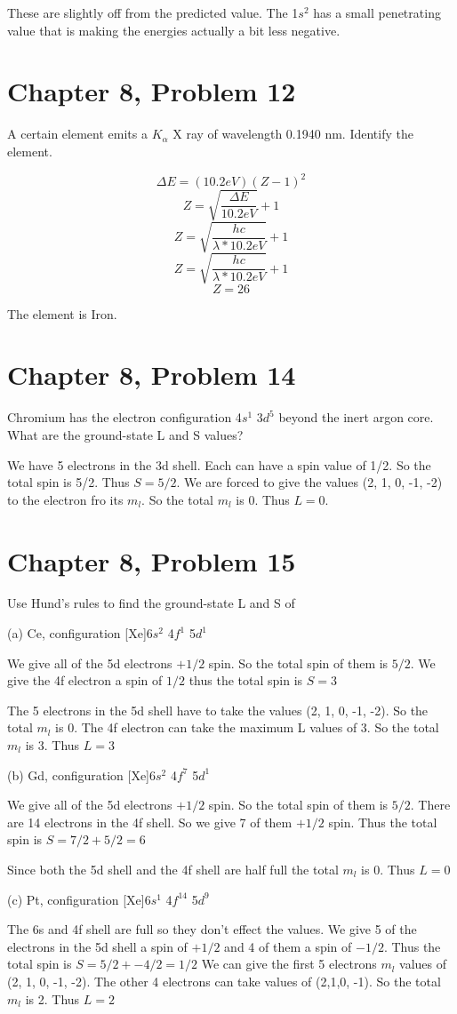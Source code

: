 \documentclass[12pt]{article}
\begin{document}
These are slightly off from the predicted value. The 1$s^2$ has a small penetrating value that is making the energies actually a bit less negative.


\section*{Chapter 8, Problem 12}


A certain element emits a ${K_\alpha}$ X ray of wavelength 0.1940 nm. Identify the element.

$$ \Delta E = (10.2 eV)(Z - 1)^2 $$
$$ Z = \sqrt{\frac{\Delta E}{10.2 eV}} + 1 $$
$$ Z = \sqrt{\frac{hc}{\lambda * 10.2 eV}} + 1 $$
$$ Z = \sqrt{\frac{hc}{\lambda * 10.2 eV}} + 1 $$
$$ Z = 26 $$

The element is Iron.


\section*{Chapter 8, Problem 14}


Chromium has the electron configuration 4$s^1$ 3$d^5$ beyond the inert argon core. What are the ground-state L and S values?

We have 5 electrons in the 3d shell. Each can have a spin value of 1/2. So the total spin is 5/2. Thus $S = 5/2$. We are forced to give the values (2, 1, 0, -1, -2) to the electron fro its $m_l$. So the total $m_l$ is 0. Thus $L = 0$.



\section*{Chapter 8, Problem 15}

Use Hund's rules to ﬁnd the ground-state L and S of

(a) Ce, configuration [Xe]6$s^2$ 4$f^1$ 5$d^1$

We give all of the 5d electrons $+1/2$ spin. So the total spin of them is $ 5 / 2$. We give the 4f electron a spin of $1/2$ thus the total spin is $ S = 3$

The 5 electrons in the 5d shell have to take the values (2, 1, 0, -1, -2). So the total $m_l$ is 0. The 4f electron can take the maximum L values of 3. So the total $m_l$ is 3. Thus $L = 3$

(b) Gd, configuration [Xe]6$s^2$ 4$f^7$ 5$d^1$

We give all of the 5d electrons $+1/2$ spin. So the total spin of them is $ 5 / 2$. There are 14 electrons in the 4f shell. So we give 7 of them $+1/2$ spin. Thus the total spin is $ S = 7/ 2 + 5 / 2 = 6$

Since both the 5d shell and the 4f shell are half full the total $m_l$ is 0. Thus $L = 0$

(c) Pt, configuration [Xe]6$s^1$ 4$f^{14}$ 5$d^9$

The 6s and 4f shell are full so they don't effect the values. We give 5 of the electrons in the 5d shell a spin of $+1/2$ and 4 of them a spin of $-1/2$. Thus the total spin is $ S = 5/2 + -4/2 = 1/2$ We can give the first 5 electrons $m_l$ values of (2, 1, 0, -1, -2). The other 4 electrons can take values of (2,1,0, -1). So the total $m_l$ is 2. Thus $L = 2$
\end{document}
